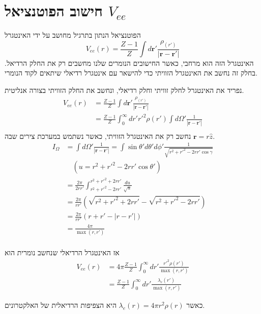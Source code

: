\section{חישוב הפוטנציאל $V_{ee}$}
הפוטנציאל הנתון בתרגיל מחושב על ידי האינטגרל
$$
V_{ee}(r) = \frac{Z-1}{Z}\int d\mathbf{r}' \frac{\rho_(r')}{|\mathbf{r} - \mathbf{r}'|} 
$$
האינטגרל הזה הוא מרחבי, כאשר החישובים הנומרים שלנו מחשבים רק את החלק הרדיאל. 
בחלק זה נחשב את האינטגרל הזוויתי כדי להישאר עם אינטגרל רדיאלי שיתאים לקוד הנומרי.
\par
נפריד את האינטגרל לחלק זוויתי וחלק רדיאלי, ונחשב את החלק הזוויתי בצורה אנליטית.
\begin{align*}
    V_{ee}(r) 
    &= \frac{Z-1}{Z}\int d\mathbf{r}' \frac{\rho_(r')}{|\mathbf{r} - \mathbf{r}'|} \\
    &= \frac{Z-1}{Z}\int_0^\infty dr' r'^2 \rho(r') \int d\Omega' \frac{1}{|\mathbf{r} - \mathbf{r}'|} \\
\end{align*}
נחשב רק את האינטגרל הזוויתי, כאשר נשתמש במערכת צירים שבה $\mathbf{r} = r \hat{z}$.
\begin{align*}
    I_\Omega 
    &= \int d\Omega' \frac{1}{|\mathbf{r} - \mathbf{r}'|} 
    = \int \sin\theta' d\theta' d\phi' \frac{1}{\sqrt{r^2 + r'^2 - 2 r r' \cos\gamma}} \\
    &\quad\left( u = r^2 + r'^2 - 2rr'\cos\theta' \right) \\
    &= \frac{2\pi}{2 r r'} \int_{r^2 + r'^2 -2r r'}^{r^2 + r'^2 +2r r'} \frac{du}{\sqrt{u}} \\
    &= \frac{2\pi}{r r'} \left( \sqrt{r^2 + r'^2 + 2 r r'} - \sqrt{r^2 + r'^2 - 2 r r'} \right) \\
    &= \frac{2\pi}{r r'} \left( r + r' - |r - r'| \right) \\
    &= \frac{4\pi}{\max(r,r')} \\
\end{align*}

אז האינטגרל הרדיאלי שנחשב נומרית הוא
\begin{align*}
    V_{ee}(r) 
    &= 4\pi\frac{Z-1}{Z}\int_0^\infty dr' \frac{r'^2 \rho(r')}{\max(r,r')} \\
    &= \frac{Z-1}{Z}\int_0^\infty dr' \frac{\lambda_e(r')}{\max(r,r')}
\end{align*}

כאשר $\lambda_e(r) = 4\pi r^2\rho(r)$ היא הצפיפות הרדיאלית של האלקטרונים.
